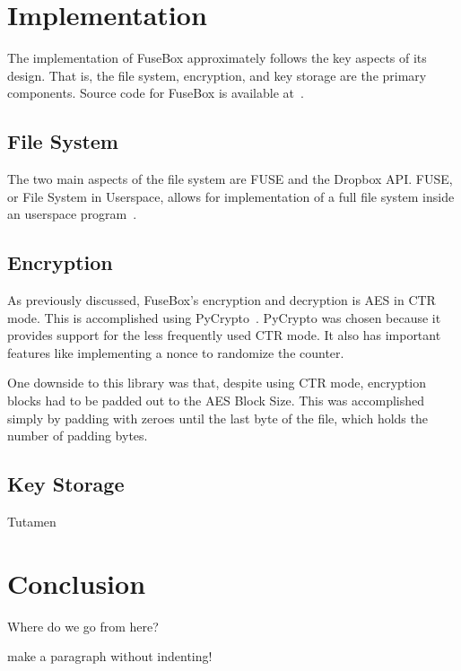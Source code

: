 \documentclass[11pt,twocolumn,letterpaper]{article}
\newcommand{\appname}{FuseBox }
\newcommand{\appnameWOspace}{FuseBox}
\newcommand{\custos}{Tutamen }
\begin{document}
\section{Implementation}
\label{sec:implementation}
The implementation of \appname approximately follows the key aspects
of its design. That is, the file system, encryption, and key storage
are the primary components. Source code for \appname is available at~\cite{FuseBox}.

\subsection{File System}
\label{sec:fsimp}
The two main aspects of the file system are FUSE and the Dropbox
API. FUSE, or File System in Userspace, allows for implementation of a
full file system inside an userspace program~\cite{fuse}.

\subsection{Encryption}
\label{sec:encimp}
As previously discussed, \appnameWOspace's encryption and decryption
is AES in CTR mode. This is accomplished using PyCrypto~\cite{pycrypto}.
PyCrypto was chosen because it provides support for the less
frequently used CTR
mode. It also has important features like implementing a nonce to
randomize the counter. 
\par One downside to this library was that, despite using CTR mode,
encryption blocks had to be padded out to the AES Block Size. This was
accomplished simply by padding with zeroes until the last byte of the
file, which holds the number of padding bytes.  

\subsection{Key Storage}
\label{sec:ksimp}
\custos

\section{Conclusion}
\label{sec:conclusion}

Where do we go from here?

\noindent
make a paragraph without indenting!



\end{document}
